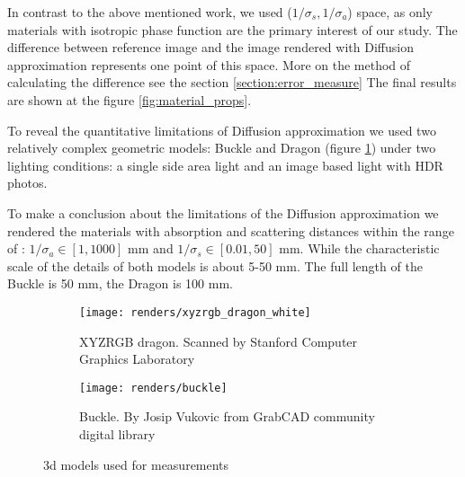 In contrast to the above mentioned work, we used ($1/\sigma_s, 1/\sigma_a$) space, as only materials
with isotropic phase function are the primary interest of our study. The difference between
reference image and the image rendered with Diffusion approximation represents one point of this
space. More on the method of calculating the difference see the section
\ref{section:error_measure} The final results are shown at the figure \ref{fig:material_props}.

To reveal the quantitative limitations of Diffusion approximation we used two relatively complex
geometric models: Buckle and Dragon (figure \ref{fig:measurements_models}) under two lighting
conditions:
a single side area light and an image based light with HDR photos.

To make a conclusion about the limitations of the Diffusion approximation we rendered the
materials with absorption and scattering distances within the range of : $1/\sigma_a \in
[1,1000]$ mm and $1/\sigma_s \in [0.01,50]$ mm. While the characteristic scale of the details of
both models is about 5-50 mm. The full length of the Buckle is 50 mm, the Dragon is 100 mm.

\begin{figure}[h]
    \centering
    \begin{subfigure}{0.48\textwidth}
        \texttt{[image: renders/xyzrgb\_dragon\_white]}
        \caption{XYZRGB dragon. Scanned by Stanford Computer Graphics Laboratory}
    \end{subfigure}
    \begin{subfigure}{0.48\textwidth}
        \texttt{[image: renders/buckle]}
        \caption{Buckle. By Josip Vukovic from GrabCAD community digital library}
    \end{subfigure}
    \caption{3d models used for measurements}
    \label{fig:measurements_models}
\end{figure}


